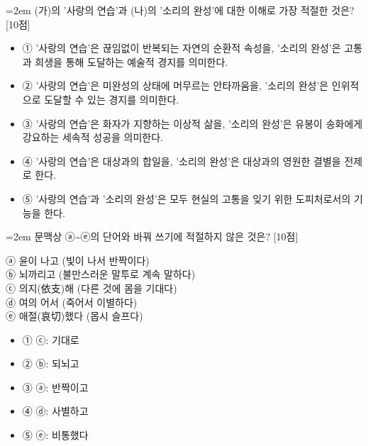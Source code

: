 \documentclass[10pt,a4paper]{article}
\newcommand{\qnum}[1]{%
  \tikz[baseline=(num.base)]{%
    \node[circle, fill=numCircle, text=white, inner sep=0pt,
          minimum size=18pt, font=\small\bfseries] (num) {#1};%
  }%
}
\newcommand{\pts}[1]{%
  \hfill\textcolor{ptsBadge}{[#1점]}%
}
\begin{document}
\vspace{4mm}
\begin{minipage}{\columnwidth}
{\hangindent=2em
\qnum{34}\enspace (가)의 '사랑의 연습'과 (나)의 '소리의 완성'에 대한 이해로 가장 적절한 것은? \pts{10}
\par}

\vspace{3mm}
\begin{itemize}[leftmargin=2.5em, labelsep=0.3em, label={}, itemsep=4pt, parsep=1pt, topsep=0pt]
  \item ① '사랑의 연습'은 끊임없이 반복되는 자연의 순환적 속성을, '소리의 완성'은 고통과 희생을 통해 도달하는 예술적 경지를 의미한다.
  \item ② '사랑의 연습'은 미완성의 상태에 머무르는 안타까움을, '소리의 완성'은 인위적으로 도달할 수 있는 경지를 의미한다.
  \item ③ '사랑의 연습'은 화자가 지향하는 이상적 삶을, '소리의 완성'은 유봉이 송화에게 강요하는 세속적 성공을 의미한다.
  \item ④ '사랑의 연습'은 대상과의 합일을, '소리의 완성'은 대상과의 영원한 결별을 전제로 한다.
  \item ⑤ '사랑의 연습'과 '소리의 완성'은 모두 현실의 고통을 잊기 위한 도피처로서의 기능을 한다.
\end{itemize}
\end{minipage}
\vspace{4mm}

\vspace{4mm}
\begin{minipage}{\columnwidth}
{\hangindent=2em
\qnum{35}\enspace 문맥상 ⓐ\textasciitilde{}ⓔ의 단어와 바꿔 쓰기에 적절하지 않은 것은? \pts{10}
\par}

\vspace{3mm}
\begin{tcolorbox}[bogi]
ⓐ 윤이 나고 (빛이 나서 반짝이다) \\{}
ⓑ 뇌까리고 (불만스러운 말투로 계속 말하다) \\{}
ⓒ 의지(依支)해 (다른 것에 몸을 기대다) \\{}
ⓓ 여의 어서 (죽어서 이별하다) \\{}
ⓔ 애절(哀切)했다 (몹시 슬프다)
\end{tcolorbox}
\vspace{3mm}
\begin{itemize}[leftmargin=2.5em, labelsep=0.3em, label={}, itemsep=4pt, parsep=1pt, topsep=0pt]
  \item ① ⓒ: 기대로
  \item ② ⓑ: 되뇌고
  \item ③ ⓐ: 반짝이고
  \item ④ ⓓ: 사별하고
  \item ⑤ ⓔ: 비통했다
\end{itemize}
\end{minipage}
\vspace{4mm}
\end{document}
